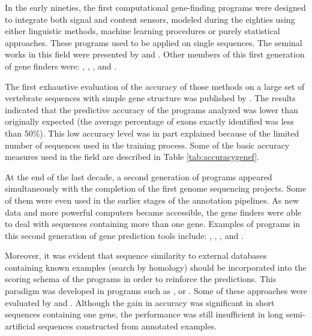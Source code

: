 
In the early nineties, the first computational gene-finding programs were
designed to integrate both signal and content sensors, modeled during the eighties
using either linguistic methods, machine learning procedures or purely 
statistical approaches. These programs used to be applied on single sequences. 
The seminal works in this field were presented by 
\citet{gelfand:1990a} and \citet{fields:1990a}. Other members 
of this first generation of gene finders were:  \citep{solovyev:1994a}, 
 \citep{guigo:1992a},  \citep{dong:1994a},  
\citep{borodovsky:1993a} and  \citep{uberbacher:1991a}. 

The first exhaustive evaluation of the accuracy of those methods on a large set of vertebrate 
sequences with simple gene structure was published by \citet{burset:1996a}. The results indicated 
that the predictive accuracy of the programs analyzed was lower than originally expected 
(the average percentage of exons exactly identified was less than 50\%). This low 
accuracy level was in part explained because of the limited number of sequences 
used in the training process. Some of the basic accuracy measures used in the field are 
described in Table \ref{tab:accuracygenef}.

At the end of the last decade, a second generation of programs appeared simultaneously
with the completion of the first genome sequencing projects. Some of them were even 
used in the earlier stages of the annotation pipelines. As new data and more 
powerful computers became accessible, the gene finders were able to deal 
with sequences containing more than one gene. Examples of programs in
this second generation of gene prediction tools include: 
 \citep{parra:2000a},  \citep{kulp:1996a}, 
 \citep{burge:1997a},  \citep{krogh:1997a} 
and  \citep{zhang:1997a}. 

Moreover, it was evident that sequence similarity to external databases containing known examples 
(search by homology) should be incorporated into the scoring schema of the programs in order to 
reinforce the predictions. This paradigm was developed in programs such as  
\citep{birney:1997a},  \citep{xu:1997a} or  \citep{gelfand:1996a}.
Some of these approaches were evaluated by \citet{guigo:2000a} and \citet{rogic:2001a}. 
Although the gain in accuracy was significant in short sequences containing one gene, the 
performance was still insufficient in long semi-artificial sequences constructed from 
annotated examples.

